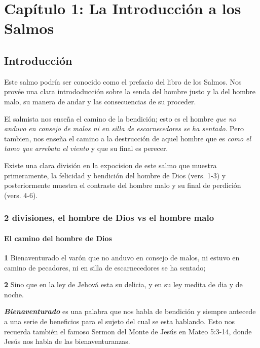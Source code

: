 \chapter{Capítulo 1: La Introducción a los Salmos}

\section{Introducción}

Este salmo podría ser conocido como el prefacio del libro de los
Salmos. Nos provée una clara intrododucción sobre la senda del hombre
justo y la del hombre malo, su manera de andar y las consecuencias de
su proceder.

El salmista nos enseña el camino de la bendición; esto es el hombre
\textit{que no anduvo en consejo de malos ni en silla de
escarnecedores se ha sentado}. Pero tambien, nos enseña el camino a
la destrucción de aquel hombre que es \textit{como el tamo que arrebata el
viento} y que su final es perecer.

Existe una clara división en la expocision de este salmo que muestra
primeramente, la felicidad y bendición del hombre de Dios (vers. 1-3) y
posteriormente muestra el contraste del hombre malo y su final de
perdición (vers. 4-6).

\subsection{2 divisiones, el hombre de Dios vs el hombre malo}

\subsubsection{El camino del hombre de Dios}
\begin{quotebox}
\textbf{1} Bienaventurado el varón que no anduvo en consejo de malos,
ni estuvo en camino de pecadores, ni en silla de escarnecedores se ha
sentado;

\textbf{2} Sino que en la ley de Jehová esta su delicia, y en su ley
medita de dia y de noche.
\end{quotebox}

\textbf{\textit{Bienaventurado}} es una palabra que nos habla de
bendición y siempre antecede a una serie de beneficios para el sujeto del
cual se esta hablando.  Esto nos recuerda también el famoso Sermon del
Monte de Jesús en Mateo 5:3-14, donde Jesús nos habla de las
bienaventuranzas.

